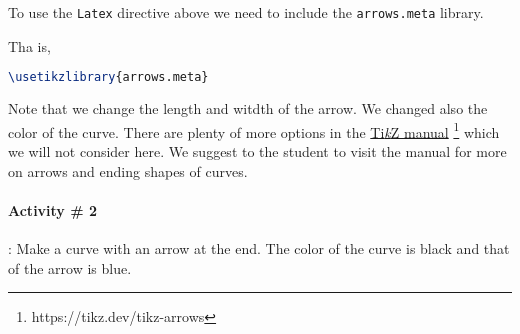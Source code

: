 \documentclass[12pt]{article}
\newcommand{\myTikZ}{Ti\textit{k}Z }
\begin{document}
\begin{comment}
\begin{lstlisting}[language=tex]
\begin{tikzpicture}[xscale=2}
    \coordinate (O) at (0,0);
    \pgfmathsetmacro{\startAngle}{0}  % units of degrees
    \pgfmathsetmacro{\endAngle}{90}  % units of degrees
    \pgfmathsetmacro{\R}{2}  % units of points
    \draw[-{Latex[length=5mm, width=3mm]}, purple] (O) 
      arc (\startAngle:\endAngle:\R); 
\end{tikzpicture}
\end{lstlisting}
Observe that we can split a line in two (see the instruction \texttt{arc}) with no special 
characters needed.

\begin{tikzpicture}[xscale = 2]
    \coordinate (O) at (0,0);
    \pgfmathsetmacro{\startAngle}{0}  %
    \pgfmathsetmacro{\endAngle}{90}  %
    \pgfmathsetmacro{\R}{2}  %
    \draw[-{Latex[length=5mm, width=3mm]}, purple] (O) arc (\startAngle:\endAngle:\R); 
\end{tikzpicture}
\end{comment}

To use the \texttt{Latex} directive above we need to include the \texttt{arrows.meta} library.

Tha is, 

\begin{lstlisting}[language=tex]
  \usetikzlibrary{arrows.meta}
\end{lstlisting}

Note that we change the length and witdth of the arrow. We changed also the color
of the curve. There are plenty of more options in the
\href{https://tikz.dev/tikz-arrows}{\myTikZ manual}
\footnote{https://tikz.dev/tikz-arrows} 
which we will not consider here. We suggest to the student to visit the manual for more
on arrows and ending shapes of curves.

\paragraph{Activity \# 2}: Make a curve with an arrow at the end. The color of the
curve is black and that of the arrow is blue.
\vspace{0.5in}
\end{document}
